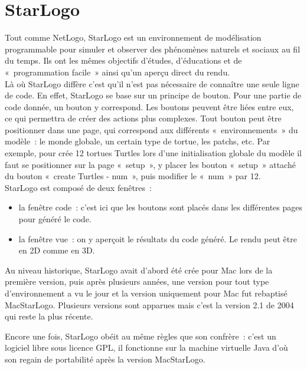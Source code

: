 \section{StarLogo}
\label{StarLogo}
Tout comme NetLogo, StarLogo est un environnement de modélisation programmable pour simuler et observer des phénomènes naturels et sociaux au fil du temps.
Ils ont les mêmes objectifs d'études, d'éducations et de «~programmation facile~» ainsi qu'un aperçu direct du rendu.
\\

Là où StarLogo diffère c'est qu'il n'est pas nécessaire de connaître une seule ligne de code. En effet, StarLogo se base sur un principe de bouton. Pour une partie de code donnée, un bouton y correspond. Les boutons peuvent être liées entre eux, ce qui permettra de créer des actions plus complexes.
Tout bouton peut être positionner dans une page, qui correspond aux différents «~environnements~» du modèle~: le monde globale, un certain type de tortue, les patchs, etc.
Par exemple, pour crée 12 tortues Turtles lors d'une initialisation globale du modèle il faut se positionner sur la page «~setup~», y placer les bouton «~setup~» attaché du bouton «~create Turtles - num~», puis modifier le «~num~» par 12.\\


StarLogo est composé de deux fenêtres~:
\begin{itemize}
  \item la fenêtre code~: c'est ici que les boutons sont placés dans les différentes pages pour généré le code.
  \item la fenêtre vue~: on y aperçoit le résultats du code généré. Le rendu peut être en 2D comme en 3D.\\
\end{itemize}

Au niveau historique, StarLogo avait d'abord été crée pour Mac lors de la première version, puis après plusieurs années, une version pour tout type d'environnement a vu le jour et la version uniquement pour Mac fut rebaptisé MacStarLogo. Plusieurs versions sont apparues mais c'est la version 2.1 de 2004 qui reste la plus récente.


Encore une fois, StarLogo obéit au même règles que son confrère~: c'est un logiciel libre sous licence GPL, il fonctionne sur la machine virtuelle Java d'où son regain de portabilité après la version MacStarLogo.
